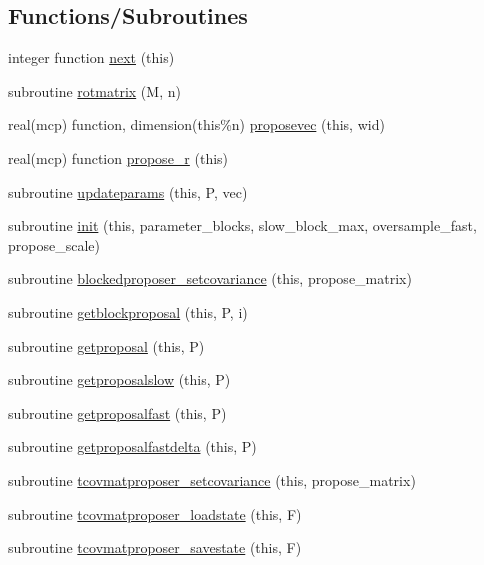 \subsection*{Functions/\+Subroutines}
\begin{DoxyCompactItemize}
\item 
integer function \mbox{\hyperlink{namespacepropose_a57ab2c55501784356748335378f0ca91}{next}} (this)
\item 
subroutine \mbox{\hyperlink{namespacepropose_a3315b3e0b92d1cf9fa29628d291634de}{rotmatrix}} (M, n)
\item 
real(mcp) function, dimension(this\%n) \mbox{\hyperlink{namespacepropose_a2c9bb747ee6cc87964f354764f10d58c}{proposevec}} (this, wid)
\item 
real(mcp) function \mbox{\hyperlink{namespacepropose_a5181089142665b7ba3e73b0e8517744c}{propose\+\_\+r}} (this)
\item 
subroutine \mbox{\hyperlink{namespacepropose_aee79ab6a28983b4a95931840fa5592e3}{updateparams}} (this, P, vec)
\item 
subroutine \mbox{\hyperlink{namespacepropose_a4a4f0ef5bf70846bd7b2274da1f889cb}{init}} (this, parameter\+\_\+blocks, slow\+\_\+block\+\_\+max, oversample\+\_\+fast, propose\+\_\+scale)
\item 
subroutine \mbox{\hyperlink{namespacepropose_ad24a067fcde7527fedd0ecb5f3fac8c5}{blockedproposer\+\_\+setcovariance}} (this, propose\+\_\+matrix)
\item 
subroutine \mbox{\hyperlink{namespacepropose_ad8938d5b08fd1352284320a465fa0dd1}{getblockproposal}} (this, P, i)
\item 
subroutine \mbox{\hyperlink{namespacepropose_acc9c3d417d1630086e0f2e46eda9482c}{getproposal}} (this, P)
\item 
subroutine \mbox{\hyperlink{namespacepropose_a593b61b41784923a7b85bc8a66c07ef8}{getproposalslow}} (this, P)
\item 
subroutine \mbox{\hyperlink{namespacepropose_ac628bde62d39c32001cbd8b6a33fb2cc}{getproposalfast}} (this, P)
\item 
subroutine \mbox{\hyperlink{namespacepropose_a336c9a51cd0387485ce6184eb753c720}{getproposalfastdelta}} (this, P)
\item 
subroutine \mbox{\hyperlink{namespacepropose_a8f227417f812244dfc68539ff9b75353}{tcovmatproposer\+\_\+setcovariance}} (this, propose\+\_\+matrix)
\item 
subroutine \mbox{\hyperlink{namespacepropose_aa4a55115a922af4c660ba77e969a2fc1}{tcovmatproposer\+\_\+loadstate}} (this, F)
\item 
subroutine \mbox{\hyperlink{namespacepropose_a9a1013a605e00c63e36aa86ab4d4e938}{tcovmatproposer\+\_\+savestate}} (this, F)
\end{DoxyCompactItemize}
